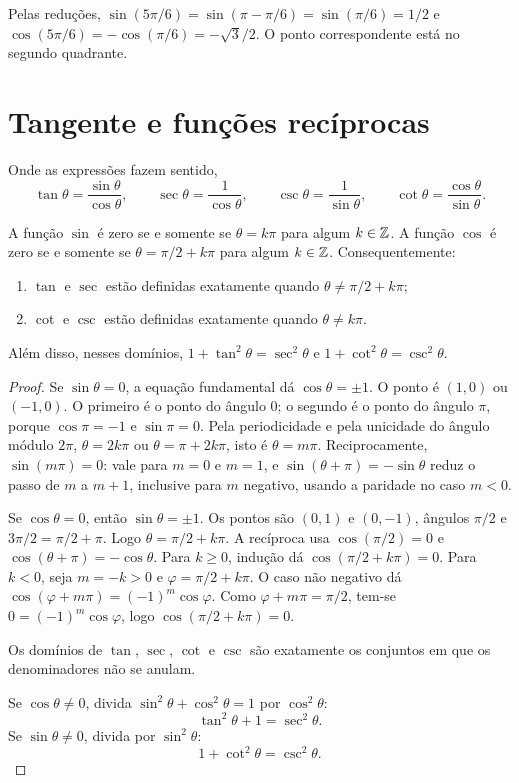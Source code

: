 \documentclass[11pt,a4paper]{article}
\begin{document}
\begin{exemplo}
Pelas reduções, $\sin(5\pi/6)=\sin(\pi-\pi/6)=\sin(\pi/6)=1/2$ e $\cos(5\pi/6)=-\cos(\pi/6)=-\sqrt{3}/2$. O ponto correspondente está no segundo quadrante.
\end{exemplo}

\section{Tangente e funções recíprocas}

\begin{definicao}
Onde as expressões fazem sentido,
\[
\tan\theta=\frac{\sin\theta}{\cos\theta},\qquad
\sec\theta=\frac{1}{\cos\theta},\qquad
\csc\theta=\frac{1}{\sin\theta},\qquad
\cot\theta=\frac{\cos\theta}{\sin\theta}.
\]
\end{definicao}

\begin{proposicao}[Domínios]\label{prop:dominios-trig}
A função $\sin$ é zero se e somente se $\theta=k\pi$ para algum $k\in\mathbb{Z}$. A função $\cos$ é zero se e somente se $\theta=\pi/2+k\pi$ para algum $k\in\mathbb{Z}$. Consequentemente:
\begin{enumerate}
\item $\tan$ e $\sec$ estão definidas exatamente quando $\theta\neq \pi/2+k\pi$;
\item $\cot$ e $\csc$ estão definidas exatamente quando $\theta\neq k\pi$.
\end{enumerate}
Além disso, nesses domínios, $1+\tan^2\theta=\sec^2\theta$ e $1+\cot^2\theta=\csc^2\theta$.
\end{proposicao}

\begin{proof}
Se $\sin\theta=0$, a equação fundamental dá $\cos\theta=\pm 1$. O ponto é $(1,0)$ ou $(-1,0)$. O primeiro é o ponto do ângulo $0$; o segundo é o ponto do ângulo $\pi$, porque $\cos\pi=-1$ e $\sin\pi=0$. Pela periodicidade e pela unicidade do ângulo módulo $2\pi$, $\theta=2k\pi$ ou $\theta=\pi+2k\pi$, isto é $\theta=m\pi$. Reciprocamente, $\sin(m\pi)=0$: vale para $m=0$ e $m=1$, e $\sin(\theta+\pi)=-\sin\theta$ reduz o passo de $m$ a $m+1$, inclusive para $m$ negativo, usando a paridade no caso $m<0$.

Se $\cos\theta=0$, então $\sin\theta=\pm 1$. Os pontos são $(0,1)$ e $(0,-1)$, ângulos $\pi/2$ e $3\pi/2=\pi/2+\pi$. Logo $\theta=\pi/2+k\pi$. A recíproca usa $\cos(\pi/2)=0$ e $\cos(\theta+\pi)=-\cos\theta$. Para $k\ge 0$, indução dá $\cos(\pi/2+k\pi)=0$. Para $k<0$, seja $m=-k>0$ e $\varphi=\pi/2+k\pi$. O caso não negativo dá $\cos(\varphi+m\pi)=(-1)^m\cos\varphi$. Como $\varphi+m\pi=\pi/2$, tem-se $0=(-1)^m\cos\varphi$, logo $\cos(\pi/2+k\pi)=0$.

Os domínios de $\tan$, $\sec$, $\cot$ e $\csc$ são exatamente os conjuntos em que os denominadores não se anulam.

Se $\cos\theta\neq 0$, divida $\sin^2\theta+\cos^2\theta=1$ por $\cos^2\theta$:
\[
\tan^2\theta+1=\sec^2\theta.
\]
Se $\sin\theta\neq 0$, divida por $\sin^2\theta$:
\[
1+\cot^2\theta=\csc^2\theta.
\]
\end{proof}
\end{document}
